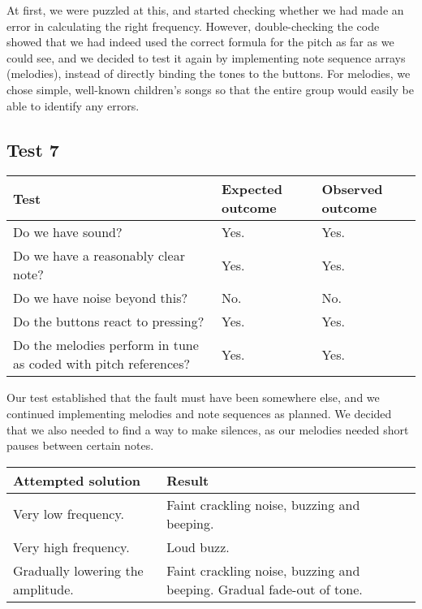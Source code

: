 At first, we were puzzled at this, and started checking whether we had made an error in calculating the right frequency. However, double-checking the code showed that we had indeed used the
correct formula for the pitch as far as we could see, and we
decided to test it again by implementing note sequence arrays
(melodies), instead of directly binding the tones to the buttons. For
melodies, we chose simple, well-known children's songs so that the
entire group would easily be able to identify any errors.

\subsection*{Test 7}
\begin{center}
\begin{tabular}{|p{3.6cm}|p{3.6cm}|p{3.6cm}|}
\hline
{\sc Test} & {\sc Expected outcome} & {\sc Observed outcome}\\ \hline
Do we have sound? & Yes. & Yes.\\ \hline
Do we have a reasonably clear note? & Yes. & Yes. \\ \hline
Do we have noise beyond this? & No. & No. \\ \hline
Do the buttons react to pressing? & Yes. & Yes.\\ \hline
Do the melodies perform in tune as coded with pitch references? & Yes. &
Yes. \\ \hline
\end{tabular}
\end{center}

Our test established that the fault must have been somewhere else, and we
continued implementing melodies and note sequences as planned. We
decided that we also needed to find a way to make silences, as our
melodies needed short pauses between certain notes.

\begin{center}
\begin{tabular}{|p{5cm}|p{5cm}|}
\hline
{\sc Attempted solution} & {\sc Result} \\ \hline
Very low frequency.	& Faint crackling noise, buzzing and beeping.  \\ \hline
Very high frequency. & Loud buzz.  \\ \hline
Gradually lowering the amplitude. & Faint crackling noise, buzzing and beeping. Gradual fade-out of tone. \\ \hline
\end{tabular}
\end{center}

